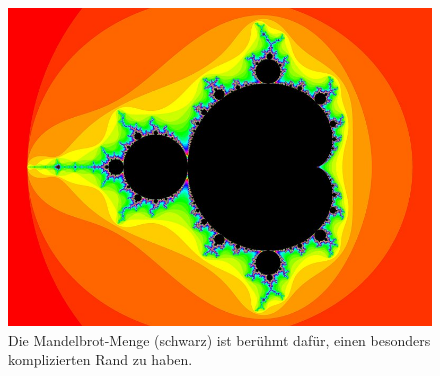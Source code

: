 %
%
%
\begin{figure}
\centering
\includegraphics[width=\textwidth]{chapters/040-felder/images/mandelbrot.jpeg}
\caption{Die Mandelbrot-Menge (schwarz) ist berühmt dafür, einen
besonders komplizierten Rand zu haben.
\label{buch:felder:fundamentallemma:fig:mandelbrot}}
\end{figure}

